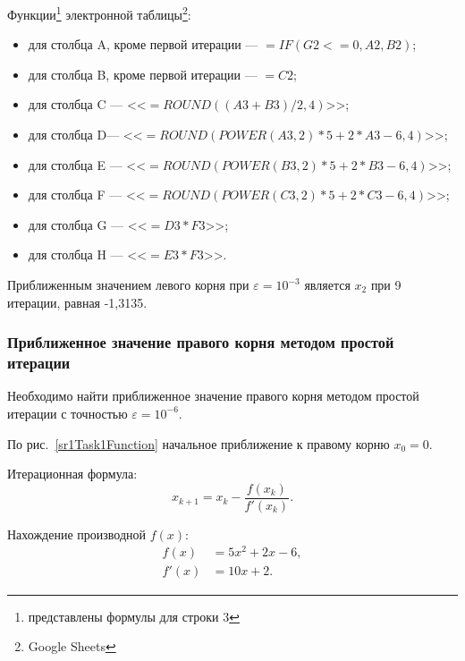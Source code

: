 \documentclass[10pt, a4paper, titlepage]{article}
\begin{document}
Функции\footnote{представлены формулы для строки 3} электронной таблицы\footnote{Google Sheets}:
\begin{itemize}
    \item для столбца A, кроме первой итерации --- $=IF(G2<=0, A2, B2)$;
    
    \item для столбца B, кроме первой итерации --- $=C2$;
    
    \item для столбца C --- <<$=ROUND((A3+B3)/2, 4)$>>;
    
    \item для столбца D--- <<$=ROUND(POWER(A3, 2)*5+2*A3-6, 4)$>>;
    
    \item для столбца E --- <<$=ROUND(POWER(B3, 2)*5+2*B3-6, 4)$>>;
    
    \item для столбца F --- <<$=ROUND(POWER(C3, 2)*5+2*C3-6, 4)$>>;
    
    \item для столбца G --- <<$=D3*F3$>>;
    
    \item для столбца H --- <<$=E3*F3$>>.

\end{itemize}

Приближенным значением левого корня при $\varepsilon=10^{-3}$ является $x_2$ при 9 итерации, равная -1,3135.

\subsubsection*{Приближенное значение правого корня методом простой итерации}

Необходимо найти приближенное значение правого корня методом простой итерации с точностью $\varepsilon=10^{-6}$.

По рис.~\ref{sr1Task1Function} начальное приближение к правому корню $x_0=0$.

Итерационная формула: $$x_{k+1}=x_k-\frac{f(x_k)}{f'(x_k)}.$$

Нахождение производной $f(x)$:
\begin{align*}
f(x) &= 5x^2+2x-6, \\
f'(x) &= 10x+2.
\end{align*}
\end{document}
